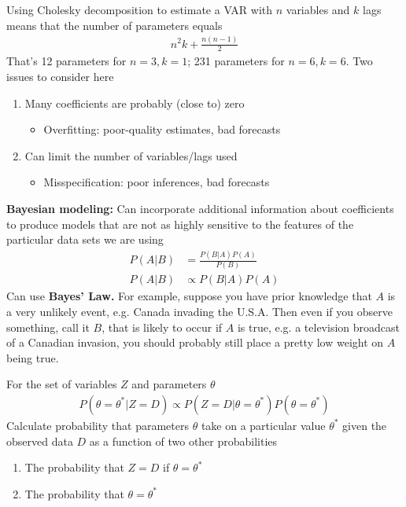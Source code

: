 \documentclass{beamer}
\begin{document}
\begin{frame}
 Using Cholesky decomposition to estimate a VAR with $n$ variables and $k$ lags means that the number of parameters equals
 \begin{align}
    n^2k + \frac{n(n-1)}{2} 
 \end{align}
 That's 12 parameters for $n=3,k=1$; 231 parameters for $n=6,k=6$.
 Two issues to consider here
 \begin{enumerate}
   \item Many coefficients are probably (close to) zero
   \begin{itemize}
     \item Overfitting: poor-quality estimates, bad forecasts
   \end{itemize}
   \item Can limit the number of variables/lags used
   \begin{itemize}
      \item Misspecification: poor inferences, bad forecasts
    \end{itemize} 
 \end{enumerate}
\end{frame}

\begin{frame}
  \textbf{Bayesian modeling:} Can incorporate additional information about coefficients to produce models that are not as highly sensitive to the features of the particular data sets we are using   
  \begin{align}
    P(A|B) &= \frac{P(B|A)P(A)}{P(B)}\\
    P(A|B)&\propto P(B|A)P(A)
  \end{align}
  Can use \textbf{Bayes' Law.} For example, suppose you have prior knowledge that $A$ is a very unlikely event, e.g. Canada invading the U.S.A. Then even if you observe something, call it $B$, that is likely to occur if $A$ is true, e.g. a television broadcast of a Canadian invasion, you should probably still place a pretty low weight on $A$ being true.
\end{frame}


\begin{frame}
 For the set of variables $Z$ and parameters $\theta$
\begin{align}
  P(\theta= \theta^* | Z=D) \propto P(Z=D | \theta =\theta^*)P(\theta= \theta^*)  
\end{align}
  \medskip
  Calculate probability that parameters $\theta$ take on a particular value $\theta^*$ given the observed data $D$ as a function of two other probabilities
\begin{enumerate}
  \item The probability that $Z=D$ if $\theta= \theta^*$
  \item The probability that $\theta = \theta^*$
\end{enumerate}
\end{frame}
\end{document}
